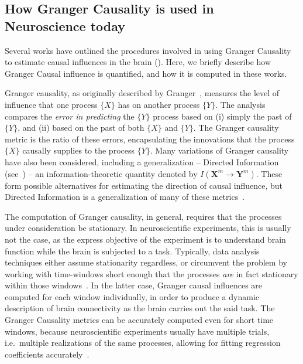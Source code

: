 \documentclass[letterpaper, 10pt, conference]{ieeeconf}
\newcommand{\m}[1]{\mathbf{#1}^m}
\begin{document}

\subsection{How Granger Causality is used in Neuroscience today}
\label{sec:gc-used-in-neuroscience}

Several works have outlined the procedures involved in using Granger Causality to estimate causal influences in the brain (\cite{bernasconi2000bidirectional,Brovelli2004BetaOscillations,Ding2000ShortWindow,Roebroeck2005MappingDirected,Bressler2011WienerGranger,Barnett2014MVGC,Ding2006GrangerCausality}). Here, we briefly describe how Granger Causal influence is quantified, and how it is computed in these works.

Granger causality, as originally described by Granger~\cite{Granger1969InvestigatingCausal}, measures the level of influence that one process $\{X\}$ has on another process $\{Y\}$. The analysis compares the \emph{error in predicting} the $\{Y\}$ process based on (i) simply the past of $\{Y\}$, and (ii) based on the past of both $\{X\}$ and $\{Y\}$. The Granger causality metric is the ratio of these errors, encapsulating the innovations that the process $\{X\}$ causally supplies to the process $\{Y\}$. Many variations of Granger causality have also been considered, including a generalization -- Directed Information (see~\cite{MasseyCausality,quinn,weissman}) -- an information-theoretic quantity denoted by $I(\m{X}\to\m{Y})$. These form possible alternatives for estimating the direction of causal influence, but Directed Information is a generalization of many of these metrics~\cite{quinn}.

The computation of Granger causality, in general, requires that the processes under consideration be stationary. In neuroscientific experiments, this is usually not the case, as the express objective of the experiment is to understand brain function while the brain is subjected to a task. Typically, data analysis techniques either assume stationarity regardless, or circumvent the problem by working with time-windows short enough that the processes \emph{are} in fact stationary within those windows~\cite{Ding2000ShortWindow}. In the latter case, Granger causal influences are computed for each window individually, in order to produce a dynamic description of brain connectivity as the brain carries out the said task. The Granger Causality metrics can be accurately computed even for short time windows, because neuroscientific experiments usually have multiple trials, i.e.\ multiple realizations of the same processes, allowing for fitting regression coefficients accurately~\cite{Ding2000ShortWindow}.
\end{document}
